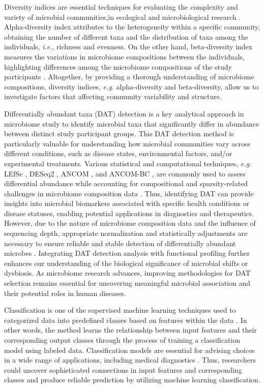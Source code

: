 \documentclass[11pt, a4paper, onecolumn, oneside]{report}
\begin{document}
        Diversity indices are essential techniques for evaluating the complexity and variety of microbial communities,in ecological and microbiological research \cite{Diversity-1, Diversity-2}. Alpha-diversity index attributes to the heterogeneity within a specific community, obtaining the number of different taxa and the distribution of taxa among the individuals, \textit{i.e.}, richness and evenness. On the other hand, beta-diversity index measures the variations in microbiome compositions between the individuals, highlighting differences among the microbiome compositions of the study participants \cite{Diversity-3}. Altogether, by providing a thorough understanding of microbiome compositions, diversity indices, \textit{e.g.} alpha-diversity and beta-diversity, allow us to investigate factors that affecting community variability and structure.

        Differentially abundant taxa (DAT) detection is a key analytical approach in microbiome study to identify microbial taxa that significantly differ in abundance between distinct study participant groups. This DAT detection method is particularly valuable for understanding how microbial communities vary across different conditions, such as disease states, environmental factors, and/or experimental treatments. Various statistical and computational techniques, \textit{e.g.} LEfSe \cite{LEfSe-1}, DESeq2 \cite{DESeq2-1}, ANCOM \cite{ANCOM-1}, and ANCOM-BC \cite{ANCOM-BC-1, ANCOM-BC-2}, are commonly used to assess differential abundance while accounting for compositional and sparsity-related challenges in microbiome composition data \cite{DAT-1, DAT-2}. Thus, identifying DAT can provide insights into microbial biomarkers associated with specific health conditions or disease statuses, enabling potential applications in diagnostics and therapeutics. However, due to the nature of microbiome composition data and the influence of sequencing depth, appropriate normalization and statistically adjustments are necessary to ensure reliable and stable detection of differentially abundant microbes \cite{DAT-3, DAT-4}. Integrating DAT detection analysis with functional profiling further enhances our understanding of the biological significance of microbial shifts or dysbiosis. As microbiome research advances, improving methodologies for DAT selection remains essential for uncovering meaningful microbial association and their potential roles in human diseases.

        Classification is one of the supervised machine learning techniques used to categorized data into predefined classes based on features within the data \cite{classification-1, classification-2}. In other words, the method learns the relationship between input features and their corresponding output classes through the process of training a classification model using labeled data. Classification models are essential for advising choices in a wide range of applications, including medical diagnostics \cite{classification-analysis-1}. Thus, researchers could uncover sophisticated connections in input features and corresponding classes and produce reliable prediction by utilizing machine learning classification.
\end{document}
